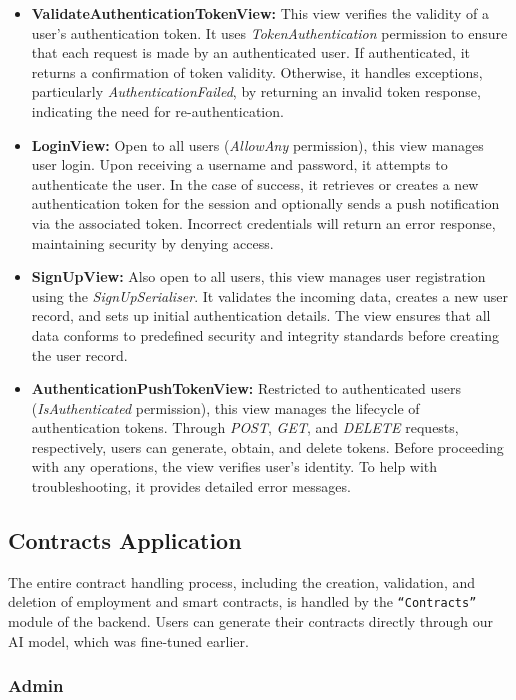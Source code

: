 \begin{itemize}
    \item \textbf{ValidateAuthenticationTokenView:} This view verifies the validity of a user's authentication token. It uses \textit{TokenAuthentication} permission to ensure that each request is made by an authenticated user. If authenticated, it returns a confirmation of token validity. Otherwise, it handles exceptions, particularly \textit{AuthenticationFailed}, by returning an invalid token response, indicating the need for re-authentication.
    \item \textbf{LoginView:} Open to all users (\textit{AllowAny} permission), this view manages user login. Upon receiving a username and password, it attempts to authenticate the user. In the case of success, it retrieves or creates a new authentication token for the session and optionally sends a push notification via the associated token. Incorrect credentials will return an error response, maintaining security by denying access.
    \item \textbf{SignUpView:} Also open to all users, this view manages user registration using the \textit{SignUpSerialiser}. It validates the incoming data, creates a new user record, and sets up initial authentication details. The view ensures that all data conforms to predefined security and integrity standards before creating the user record.
    \item \textbf{AuthenticationPushTokenView:} Restricted to authenticated users (\textit{IsAuthenticated} permission), this view manages the lifecycle of authentication tokens. Through \textit{POST}, \textit{GET}, and \textit{DELETE} requests, respectively, users can generate, obtain, and delete tokens. Before proceeding with any operations, the view verifies user's identity. To help with troubleshooting, it provides detailed error messages.
\end{itemize}

\subsection{Contracts Application}

The entire contract handling process, including the creation, validation, and deletion of employment and smart contracts, is handled by the \texttt{``Contracts''} module of the backend. Users can generate their contracts directly through our AI model, which was fine-tuned earlier.

\subsubsection{Admin} 

